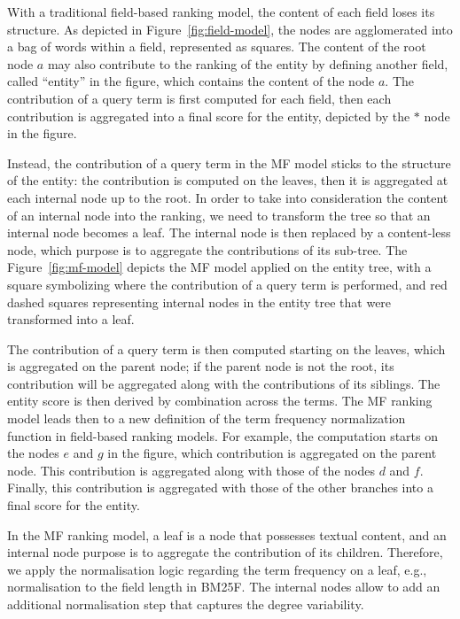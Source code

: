 With a traditional field-based ranking model, the content of each field loses its structure. As depicted in Figure~\ref{fig:field-model}, the nodes are agglomerated into a bag of words within a field, represented as squares. The content of the root node $a$ may also contribute to the ranking of the entity by defining another field, called ``entity'' in the figure, which contains the content of the node $a$. The contribution of a query term is first computed for each field, then each contribution is aggregated into a final score for the entity, depicted by the $*$ node in the figure.

Instead, the contribution of a query term in the MF model sticks to the structure of the entity: the contribution is computed on the leaves, then it is aggregated at each internal node up to the root. In order to take into consideration the content of an internal node into the ranking, we need to transform the tree so that an internal node becomes a leaf. The internal node is then replaced by a content-less node, which purpose is to aggregate the contributions of its sub-tree. The Figure~\ref{fig:mf-model} depicts the MF model applied on the entity tree, with a square symbolizing where the contribution of a query term is performed, and red dashed squares representing internal nodes in the entity tree that were transformed into a leaf.

The contribution of a query term is then computed starting on the leaves, which is aggregated on the parent node; if the parent node is not the root, its contribution will be aggregated along with the contributions of its siblings. The entity score is then derived by combination across the terms. The MF ranking model leads then to a new definition of the term frequency normalization function in field-based ranking models. For example, the computation starts on the nodes $e$ and $g$ in the figure, which contribution is aggregated on the parent node. This contribution is aggregated along with those of the nodes $d$ and $f$. Finally, this contribution is aggregated with those of the other branches into a final score for the entity.

In the MF ranking model, a leaf is a node that possesses textual content, and an internal node purpose is to aggregate the contribution of its children. Therefore, we apply the normalisation logic regarding the term frequency on a leaf, e.g., normalisation to the field length in BM25F. The internal nodes allow to add an additional normalisation step that captures the degree variability.

